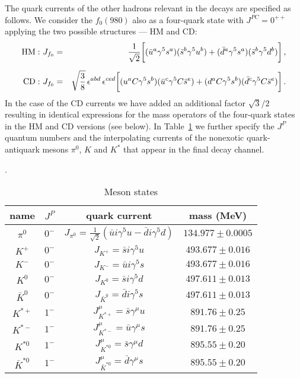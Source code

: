\documentclass[aps,prd,floatfix,superscriptaddress,showpacs,showkeys]{revtex4}
\newcommand{\bea}{\begin{eqnarray}}
\newcommand{\ena}{\end{eqnarray}}
\begin{document}
The quark currents of the other hadrons relevant in the decays are specified 
as follows. We consider the $f_0(980)$ also as a four-quark state 
with $J^{PC} = 0^{++}$ applying the  two possible structures --- HM and CD: 
\bea 
{\rm HM:} \  J_{f_0} &=& \frac{1}{\sqrt{2}} 
\biggl[  (\bar u^a \gamma^5 s^a) (\bar s^b \gamma^5  u^b)
       + (\bar d^a \gamma^5 s^a) (\bar s^b \gamma^5  d^b) 
\biggr]\,, 
\label{eq:f0-curHM}\\[2mm]
{\rm CD:} \  J_{f_0} &=& \sqrt{\frac{3}{8}} \, 
\epsilon^{abd} \, \epsilon^{ced}
\biggl[  (u^a C \gamma^5 s^b) (\bar u^c  \gamma^5 C \bar s^e)
       + (d^a C \gamma^5 s^b) (\bar d^c  \gamma^5 C \bar s^e)
\biggr]\,. 
\label{eq:f0-curCD} 
\ena 
In the case of the CD currents we have added an additional factor
$\sqrt{3}/2$ resulting in
identical expressions for the mass operators 
of the four-quark states in the HM and CD versions (see below). 
In Table~\ref{tab:bb} we further specify the $J^P$ quantum numbers and the 
interpolating currents of the nonexotic quark-antiquark mesons
$\pi^0$, $K$ and $K^*$ that appear in the final decay channel. 
%
\begin{table}[ht]
\begin{center}
\caption{Meson states}. 
\label{tab:bb}
\def\arraystretch{1.5}
\begin{tabular}{|c|c|c|c|}
\hline
name & $J^P$ & quark current & mass (MeV) \\
\hline\hline
$\pi^0$  & $0^-$ & 
$J_{\pi^0} = 
\frac{1}{\sqrt{2}} ( \bar u i \gamma^5 u  - \bar d i \gamma^5  d)$ &
$134.977 \pm 0.0005$ \\
\hline
$K^+$  & $0^-$ & $J_{K^+} = \bar s i \gamma^5 u$
& $ 493.677\pm 0.016$ \\
\hline
$K^-$  & $0^-$ & $J_{K^-} = \bar u i \gamma^5 s$
& $ 493.677\pm 0.016$ \\
\hline
$K^0$  & $0^-$ & $J_{K^0} = \bar s i \gamma^5 d$
& $ 497.611\pm 0.013$ \\
\hline
$\bar K^0$  & $0^-$ & $J_{\bar{K}^0} = \bar d i \gamma^5 s$
& $ 497.611\pm 0.013$ \\
\hline
$K^{*+}$  & $1^-$ & $J_{K^{*+}}^\mu = \bar s \gamma^\mu u$
& $ 891.76\pm 0.25$ \\
\hline
$K^{*-}$  & $1^-$ & $J_{K^{*-}}^\mu = \bar u \gamma^\mu s$
& $ 891.76\pm 0.25$ \\
\hline
$K^{*0}$  & $1^-$ & $J_{K^{*0}}^\mu = \bar s \gamma^\mu d$
& $ 895.55\pm 0.20$ \\
\hline
$\bar K^{*0}$  & $1^-$ & $J_{\bar{K}^{*0}}^\mu = \bar d \gamma^\mu s$
& $ 895.55\pm 0.20$ \\
\hline
\end{tabular}
\end{center}
\end{table}
 
\end{document}
